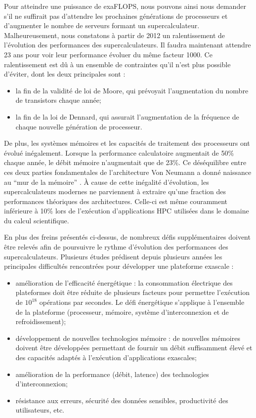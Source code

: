         Pour atteindre une puissance de \gls{exaFLOPS}, nous pouvons ainsi nous demander s'il ne suffirait pas d'attendre les prochaines générations de processeurs et d'augmenter le nombre de serveurs formant un supercalculateur. Malheureusement, nous constatons à partir de 2012 un ralentissement de l'évolution des performances des supercalculateurs. Il faudra maintenant attendre 23 ans pour voir leur performance évoluer du même facteur 1000.
        Ce ralentissement est dû à un ensemble de contraintes qu'il n'est plus possible d'éviter, dont les deux principales sont :
        \begin{itemize}
            \item la fin de la validité de loi de Moore, qui prévoyait l'augmentation du nombre de transistors chaque année;
            \item la fin de la loi de Dennard, qui assurait l'augmentation de la fréquence de chaque nouvelle génération de processeur.
        \end{itemize}
        De plus, les systèmes mémoires et les capacités de traitement des processeurs ont évolué inégalement. Lorsque la performance calculatoire augmentait de 50\% chaque année, le débit mémoire n'augmentait que de 23\%. Ce déséquilibre entre ces deux parties fondamentales de l'architecture Von Neumann a donné naissance au ``mur de la mémoire'' \cite{Wilkes2001}. À cause de cette inégalité d'évolution, les supercalculateurs modernes ne parviennent à extraire qu'une fraction des performances théoriques des architectures. Celle-ci est même couramment inférieure à 10\% \cite{Oliker2005} lors de l'exécution d'applications HPC utilisées dans le domaine du calcul scientifique.
        
        En plus des freins présentés ci-dessus, de nombreux défis supplémentaires doivent être relevés afin de poursuivre le rythme d'évolution des performances des supercalculateurs. Plusieurs études \cite{Sutter2005b, bergman2008exascale, Lucas2014, HPE2016} prédisent depuis plusieurs années les principales difficultés rencontrées pour développer une plateforme \gls{exascale} : 
        \begin{itemize}
            \item amélioration de l'efficacité énergétique : la consommation électrique des plateformes doit être réduite de plusieurs facteurs pour permettre l'exécution de $10^{18}$ opérations par secondes. Le défi énergétique s'applique à l'ensemble de la plateforme (processeur, mémoire, système d'interconnexion et de refroidissement);
            \item développement de nouvelles technologies mémoire : de nouvelles mémoires doivent être développées permettant de fournir un débit suffisamment élevé et des capacités adaptés à l'exécution d'applications exascales;
            \item amélioration de la performance (débit, latence) des technologies d'interconnexion;
            \item résistance aux erreurs, sécurité des données sensibles, productivité des utilisateurs, etc. 
        \end{itemize}

